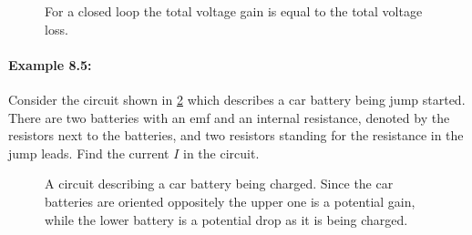 \documentclass[a4paper,12pt]{book}
\begin{document}
\begin{itemize}
\begin{figure}[ht]
    \centering
    \caption{For a closed loop the total voltage gain is equal to the total voltage loss.}
    \label{fig: voltage rule 3}
\end{figure}
\end{itemize}

\paragraph{Example 8.5:} Consider the circuit shown in \cref{fig: car charging} which describes a car battery being jump started. There are two batteries with an emf and an internal resistance, denoted by the resistors next to the batteries, and two resistors standing for the resistance in the jump leads. Find the current $I$ in the circuit.\\

  \begin{figure}[ht]
    \centering
    \caption{A circuit describing a car battery being charged. Since the car batteries are oriented oppositely the upper one is a potential gain, while the lower battery is a potential drop as it is being charged.}
    \label{fig: car charging}
\end{figure}
\end{document}
